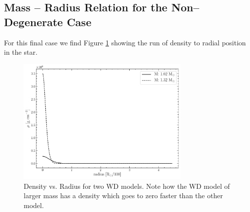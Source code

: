 \subsection{Mass -- Radius Relation for the Non--Degenerate Case}
For this final case we find Figure \ref{fig:TwoWDMass} showing the run of density to radial position in the star.
\begin{figure}[ht!]
    \centering
    \includegraphics[width=0.75\textwidth]{Graphics/WDMass1_13.pdf}
    \caption{Density vs. Radius for two WD models. Note how the WD model of larger mass has a density which goes to zero faster than the other model.}
    \label{fig:TwoWDMass}
\end{figure}

% 
% 


